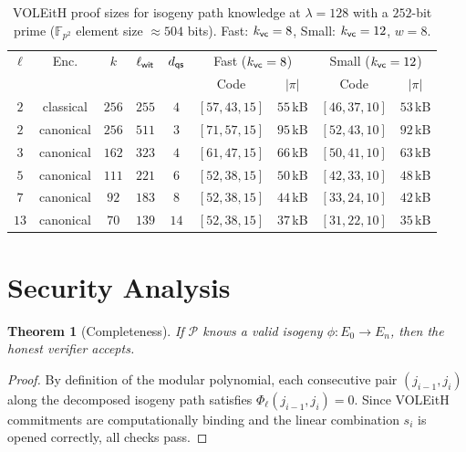 \documentclass[11pt,a4paper]{article}
\newtheorem{theorem}{Theorem}[section]
\theoremstyle{definition}
\theoremstyle{remark}
\newcommand{\F}{\mathbb{F}}
\newcommand{\calP}{\mathcal{P}}
\newcommand{\polyrel}{\Phi}
\begin{document}
\begin{table}[H]
	\centering
	\caption{VOLEitH proof sizes for isogeny path knowledge at $\lambda = 128$
		with a $252$-bit prime ($\F_{p^2}$ element size $\approx 504$ bits).
		Fast: $k_{\sf vc}=8$, Small: $k_{\sf vc}=12$, $w = 8$.}
	\label{tab:voleith-proof-sizes-p252}
	\begin{tabular}{c c c c c c c c c}
		\toprule
		$\ell$ & Enc. & $k$ & $\ell_{\sf wit}$ & $d_{\sf qs}$ &
		\multicolumn{2}{c}{Fast ($k_{\sf vc}=8$)} &
		\multicolumn{2}{c}{Small ($k_{\sf vc}=12$)} \\
		& & & & & Code & $|\pi|$ & Code & $|\pi|$ \\
		\midrule
		$2$ & classical & $256$ & $255$ & $4$ & $[57,43,15]$ & $55$\,kB & $[46,37,10]$ & $53$\,kB \\
		$2$ & canonical & $256$ & $511$ & $3$ & $[71,57,15]$ & $95$\,kB & $[52,43,10]$ & $92$\,kB \\
		$3$ & canonical & $162$ & $323$ & $4$ & $[61,47,15]$ & $66$\,kB & $[50,41,10]$ & $63$\,kB \\
		$5$ & canonical & $111$ & $221$ & $6$ & $[52,38,15]$ & $50$\,kB & $[42,33,10]$ & $48$\,kB \\
		$7$ & canonical & $92$ & $183$ & $8$ & $[52,38,15]$ & $44$\,kB & $[33,24,10]$ & $42$\,kB \\
		$13$ & canonical & $70$ & $139$ & $14$ & $[52,38,15]$ & $37$\,kB & $[31,22,10]$ & $35$\,kB \\
		\bottomrule
	\end{tabular}
\end{table}

\section{Security Analysis}

\begin{theorem}[Completeness]
	If $\calP$ knows a valid isogeny $\phi: E_0 \to E_n$, then the honest
	verifier accepts.
\end{theorem}

\begin{proof}
	By definition of the modular polynomial, each consecutive pair
	$(j_{i-1}, j_i)$ along the decomposed isogeny path satisfies
	$\polyrel_{\ell}(j_{i-1}, j_i) = 0$. Since VOLEitH commitments are
	computationally binding and the linear combination $s_i$ is opened
	correctly, all checks pass.
\end{proof}
\end{document}

